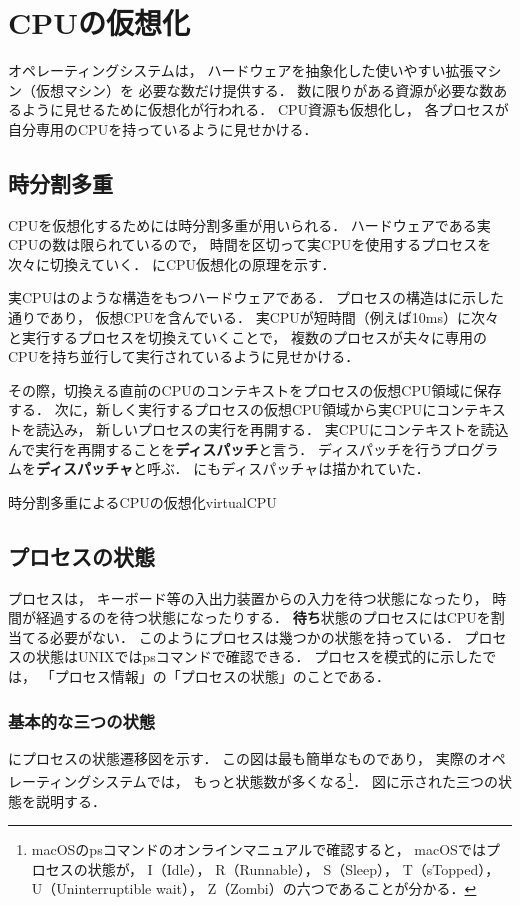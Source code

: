 \chapter{CPUの仮想化}
オペレーティングシステムは，
ハードウェアを抽象化した使いやすい拡張マシン（仮想マシン）を
必要な数だけ提供する．
数に限りがある資源が必要な数あるように見せるために仮想化が行われる．
CPU資源も仮想化し，
各プロセスが自分専用のCPUを持っているように見せかける．

\section{時分割多重}
CPUを仮想化するためには時分割多重が用いられる．
ハードウェアである実CPUの数は限られているので，
時間を区切って実CPUを使用するプロセスを次々に切換えていく．
にCPU仮想化の原理を示す．

実CPUはのような構造をもつハードウェアである．
プロセスの構造はに示した通りであり，
仮想CPUを含んでいる．
実CPUが短時間（例えば10ms）に次々と実行するプロセスを切換えていくことで，
複数のプロセスが夫々に専用のCPUを持ち並行して実行されているように見せかける．

その際，切換える直前のCPUのコンテキストをプロセスの仮想CPU領域に保存する．
次に，新しく実行するプロセスの仮想CPU領域から実CPUにコンテキストを読込み，
新しいプロセスの実行を再開する．
実CPUにコンテキストを読込んで実行を再開することを{\bf ディスパッチ}と言う．
ディスパッチを行うプログラムを{\bf ディスパッチャ}と呼ぶ．
にもディスパッチャは描かれていた．

{時分割多重によるCPUの仮想化}{virtualCPU}

\section{プロセスの状態}
プロセスは，
キーボード等の入出力装置からの入力を待つ状態になったり，
時間が経過するのを待つ状態になったりする．
{\bf 待ち}状態のプロセスにはCPUを割当てる必要がない．
このようにプロセスは幾つかの状態を持っている．
プロセスの状態はUNIXではpsコマンドで確認できる．
プロセスを模式的に示したでは，
「プロセス情報」の「プロセスの状態」のことである．

\subsection{基本的な三つの状態}
にプロセスの状態遷移図を示す．
この図は最も簡単なものであり，
実際のオペレーティングシステムでは，
もっと状態数が多くなる\footnote{
macOSのpsコマンドのオンラインマニュアルで確認すると，
macOSではプロセスの状態が，
I（Idle），
R（Runnable），
S（Sleep），
T（sTopped），
U（Uninterruptible wait），
Z（Zombi）の六つであることが分かる．}．
図に示された三つの状態を説明する．


